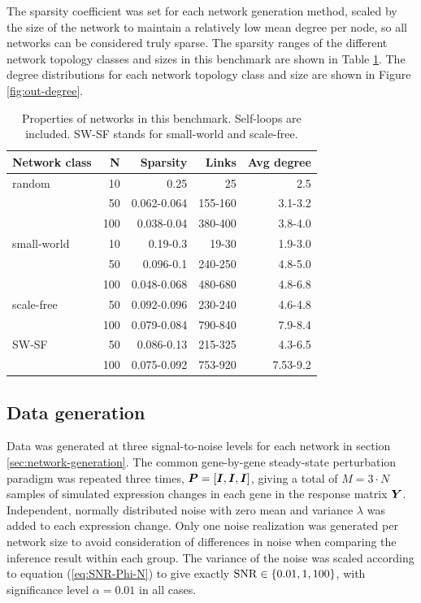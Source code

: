 The sparsity coefficient was set for each network generation method, scaled by the size of the network to maintain a relatively low mean degree per node, so all networks can be considered truly sparse.
The sparsity ranges of the different network topology classes and sizes in this benchmark are shown in Table \ref{tab:sparsity}.
The degree distributions for each network topology class and size are shown in Figure \ref{fig:out-degree}.

\begin{table}[htb]
\caption{\label{tab:sparsity}
Properties of networks in this benchmark. Self-loops are included. SW-SF stands for small-world and scale-free.}
\centering
\begin{tabular}{|l|r|r|r|r|}
\hline
Network class & N & Sparsity & Links & Avg degree\\
\hline
random & 10 & 0.25 & 25 & 2.5\\
 & 50 & 0.062-0.064 & 155-160 & 3.1-3.2\\
 & 100 & 0.038-0.04 & 380-400 & 3.8-4.0\\
\hline
small-world & 10 & 0.19-0.3 & 19-30 & 1.9-3.0\\
 & 50 & 0.096-0.1 & 240-250 & 4.8-5.0\\
 & 100 & 0.048-0.068 & 480-680 & 4.8-6.8\\
\hline
scale-free & 50 & 0.092-0.096 & 230-240 & 4.6-4.8\\
 & 100 & 0.079-0.084 & 790-840 & 7.9-8.4\\
\hline
SW-SF & 50 & 0.086-0.13 & 215-325 & 4.3-6.5\\
 & 100 & 0.075-0.092 & 753-920 & 7.53-9.2\\
\hline
\end{tabular}
\end{table}


\subsection{Data generation}
\label{sec:data_generation_results}
Data was generated at three signal-to-noise levels for each network in section \ref{sec:network-generation}.
The common gene-by-gene steady-state perturbation paradigm was repeated three times, \ie \({\boldsymbol{P}} = [{\boldsymbol{I}}, {\boldsymbol{I}}, {\boldsymbol{I}}]\), giving a total of \(M=3\cdot N\) samples of simulated expression changes in each gene in the response matrix \({\boldsymbol{Y}}\).
Independent, normally distributed noise with zero mean and variance \(\lambda\) was added to each expression change.
Only one noise realization was generated per network size to avoid consideration of differences in noise when comparing the inference result within each group.
The variance of the noise was scaled according to equation (\ref{eq:SNR-Phi-N}) to give exactly \(\operatorname{SNR} \in \{0.01,1,100\}\), with significance level \(\alpha=0.01\) in all cases.

